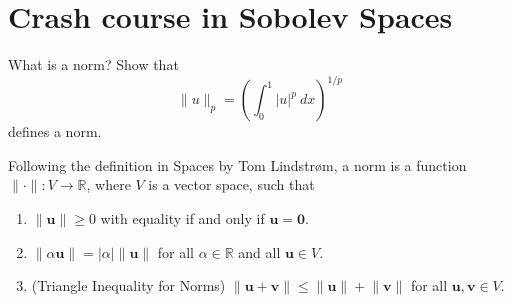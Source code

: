 \section{Crash course in Sobolev Spaces}

\begin{exercise}
    What is a norm?
    Show that
    \begin{equation*}
        \lVert u \rVert_p = \left( \int_{0}^{1} \lvert u \rvert^p \ dx \right)^{1/p}
    \end{equation*}
    defines a norm.
\end{exercise}

\begin{solution}
    Following the definition in Spaces by Tom Lindstrøm, a norm is a function $\lVert \cdot \rVert: V \to \mathbb{R}$, where $V$ is a vector space, such that
    \begin{enumerate}[label=(\roman*)] %
        \item $\lVert \boldsymbol{u} \rVert \geq 0$ with equality if and only if $\boldsymbol{u} = \boldsymbol{0}$.

        \item $\lVert \alpha \boldsymbol{u} \rVert = \lvert \alpha \rvert \lVert \boldsymbol{u} \rVert$ for all $\alpha \in \mathbb{R}$ and all $\boldsymbol{u} \in V$.

        \item (Triangle Inequality for Norms) $\lVert \boldsymbol{u} + \boldsymbol{v} \rVert \leq \lVert \boldsymbol{u} \rVert + \lVert \boldsymbol{v} \rVert$ for all $\boldsymbol{u}, \boldsymbol{v} \in V$.
    \end{enumerate}


\end{solution}
